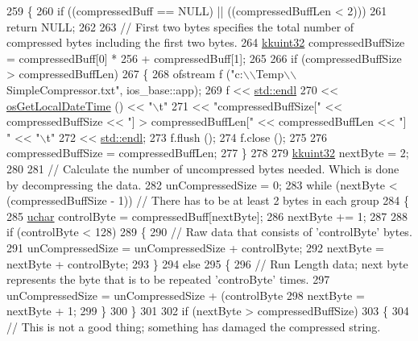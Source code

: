 \begin{DoxyCode}
259 \{
260   \textcolor{keywordflow}{if}  ((compressedBuff == NULL)  ||  ((compressedBuffLen < 2)))
261     \textcolor{keywordflow}{return}  NULL;
262 
263   \textcolor{comment}{// First two bytes specifies the total number of compressed bytes including the first two bytes.}
264   \hyperlink{namespace_k_k_b_af8d832f05c54994a1cce25bd5743e19a}{kkuint32}  compressedBuffSize = compressedBuff[0] * 256 + compressedBuff[1];
265 
266   \textcolor{keywordflow}{if}  (compressedBuffSize > compressedBuffLen)
267   \{
268     ofstream  f (\textcolor{stringliteral}{"c:\(\backslash\)\(\backslash\)Temp\(\backslash\)\(\backslash\)SimpleCompressor.txt"}, ios\_base::app);
269     f << \hyperlink{namespace_k_k_b_ad1f50f65af6adc8fa9e6f62d007818a8}{std::endl}
270       << \hyperlink{namespace_k_k_b_af54c205cde0465bcb2c74f3881a96413}{osGetLocalDateTime} ()  << \textcolor{stringliteral}{"\(\backslash\)t"}
271       << \textcolor{stringliteral}{"compressedBuffSize["} << compressedBuffSize << \textcolor{stringliteral}{"] > compressedBuffLen["} << compressedBuffLen << \textcolor{stringliteral}{"]
      "} << \textcolor{stringliteral}{"\(\backslash\)t"} 
272       << \hyperlink{namespace_k_k_b_ad1f50f65af6adc8fa9e6f62d007818a8}{std::endl};
273     f.flush ();
274     f.close ();
275 
276     compressedBuffSize = compressedBuffLen;
277   \}
278 
279   \hyperlink{namespace_k_k_b_af8d832f05c54994a1cce25bd5743e19a}{kkuint32}  nextByte = 2;
280 
281   \textcolor{comment}{// Calculate the number of uncompressed bytes needed.  Which is done by decompressing the data.}
282   unCompressedSize = 0;
283   \textcolor{keywordflow}{while}  (nextByte < (compressedBuffSize - 1))  \textcolor{comment}{// There has to be at least 2 bytes in each group}
284   \{
285     \hyperlink{namespace_k_k_b_ace9969169bf514f9ee6185186949cdf7}{uchar}  controlByte = compressedBuff[nextByte];
286     nextByte += 1;
287 
288     \textcolor{keywordflow}{if}  (controlByte < 128)
289     \{
290       \textcolor{comment}{// Raw data that consists of 'controlByte' bytes.}
291       unCompressedSize = unCompressedSize + controlByte;
292       nextByte = nextByte + controlByte;
293     \}
294     \textcolor{keywordflow}{else}
295     \{
296       \textcolor{comment}{// Run Length data;  next byte represents the byte that is to be repeated 'controByte' times.}
297       unCompressedSize = unCompressedSize + (controlByte %
298       nextByte = nextByte + 1;
299     \}
300   \}
301 
302   \textcolor{keywordflow}{if}  (nextByte > compressedBuffSize)
303   \{
304     \textcolor{comment}{// This is not a good thing; something has damaged the compressed string.}

\end{DoxyCode}
